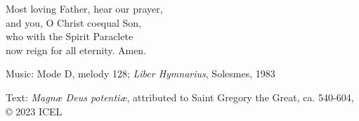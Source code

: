 \hymn



\begin{underhymnverse}
Most loving Father, hear our prayer,\\
and you, O Christ coequal Son,\\
who with the Spirit Paraclete\\
now reign for all eternity. Amen.
\end{underhymnverse}

\begin{hymnsource}
Music: Mode D, melody 128; \emph{Liber Hymnarius}, Solesmes, 1983

Text: \emph{Magnæ Deus potentiæ}, attributed to Saint Gregory the Great, ca. 540-604, © 2023 ICEL
\end{hymnsource}
